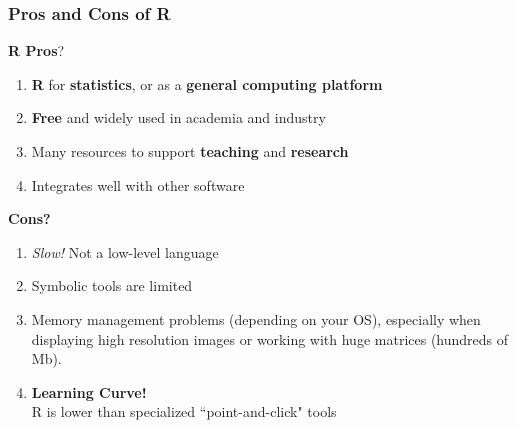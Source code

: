 \documentclass{beamer}
\begin{document}
\begin{frame}[fragile]\frametitle{Pros and Cons of R}
	\textbf{R Pros}?
	\begin{enumerate}
		\item \textbf{R} for \textbf{statistics}, or as a \textbf{general computing platform}
		\item \textbf{Free} and widely used in academia and industry
		\item Many resources to support \textbf{teaching} and \textbf{research}
		\item Integrates well with other software
	\end{enumerate}
	\textbf{Cons?}
	\begin{enumerate}
		\item \textit{Slow!} Not a low-level language
		\item Symbolic tools are limited 
		\item Memory management problems (depending on your OS), especially when displaying high resolution images or working with huge matrices (hundreds of Mb).
		\item \textbf{Learning Curve!}\\ R is lower than specialized ``point-and-click" tools
		
	\end{enumerate}
\end{frame}
\end{document}
